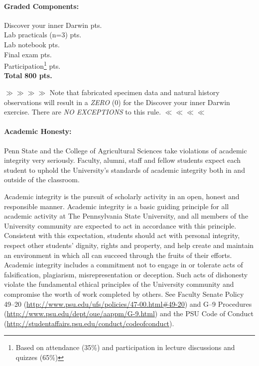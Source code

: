 \documentclass[11pt]{article}
\begin{document}
\paragraph{Graded Components:}
\begin{center} \begin{minipage}{3.8in}
\begin{flushleft}
Discover your inner Darwin    pts.  \\
Lab practicals (n=3)    pts.  \\
Lab notebook  pts.\\
Final exam    pts.  \\
Participation\footnote{Based on attendance (35\%) and participation in lecture discussions and quizzes (65\%)}     pts.  \\
\textbf{Total}   \dotfill \textbf{800 pts.} 
\end{flushleft}
\end{minipage}
\end{center}
$\gg\gg\gg\gg$ Note that fabricated specimen data and natural history observations will result in a \textit{ZERO} (0) for the Discover your inner Darwin exercise. There are \textit{NO EXCEPTIONS} to this rule. $\ll\ll\ll\ll$

\paragraph{Academic Honesty:} Penn State and the College of Agricultural Sciences take violations of academic integrity very seriously. Faculty, alumni, staff and fellow students expect each student to uphold the University's standards of academic integrity both in and outside of the classroom.

Academic integrity is the pursuit of scholarly activity in an open, honest and responsible manner. Academic integrity is a basic guiding principle for all academic activity at The Pennsylvania State University, and all members of the University community are expected to act in accordance with this principle. Consistent with this expectation, students should act with personal integrity, respect other students' dignity, rights and property, and help create and maintain an environment in which all can succeed through the fruits of their efforts. Academic integrity includes a commitment not to engage in or tolerate acts of falsification, plagiarism, misrepresentation or deception. Such acts of dishonesty violate the fundamental ethical principles of the University community and compromise the worth of work completed by others. See Faculty Senate Policy 49--20 (\url{http://www.psu.edu/ufs/policies/47-00.html#49-20}) and G--9 Procedures (\url{http://www.psu.edu/dept/oue/aappm/G-9.html}) and the PSU Code of Conduct (\url{http://studentaffairs.psu.edu/conduct/codeofconduct}).
\end{document}
